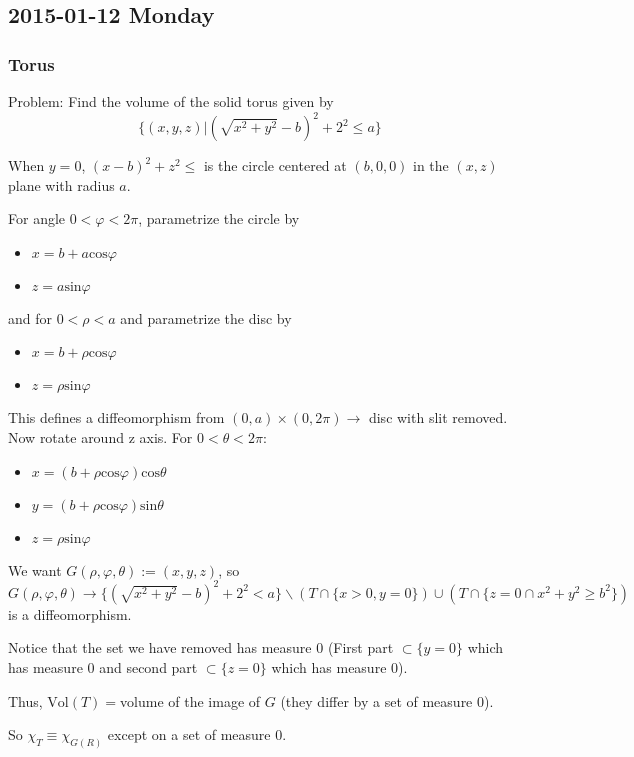 
\subsection{2015-01-12 Monday}
\subsubsection{Torus}

Problem: Find the volume of the solid torus given by 
$$\{(x,y,z)|(\sqrt{x^2+y^2}-b)^2+2^2\leq a\}$$

When $y=0$, $(x-b)^2+z^2\leq$ is the circle centered at $(b,0,0)$ in the $(x,z)$ plane with radius $a$.

For angle $0<\varphi<2\pi$, parametrize the circle by
\begin{itemize}
\item $x=b+a\text{cos}\varphi$
\item $z=a\text{sin}\varphi$
\end{itemize}
and for $0<\rho< a$ and  parametrize the disc by
\begin{itemize}
\item $x=b+\rho\text{cos}\varphi$
\item $z=\rho\text{sin}\varphi$
\end{itemize}

This defines a diffeomorphism from $(0,a)\times(0,2\pi)\rightarrow$ disc with slit removed.  Now rotate around z axis.  For $0<\theta<2\pi$:
\begin{itemize}
\item $x=(b+\rho\text{cos}\varphi)\text{cos}\theta$
\item $y=(b+\rho\text{cos}\varphi)\text{sin}\theta$
\item $z=\rho\text{sin}\varphi$
\end{itemize}

We want $G(\rho,\varphi,\theta):=(x,y,z)$, so 
$G(\rho,\varphi,\theta)\rightarrow\{(\sqrt{x^2+y^2}-b)^2+2^2< a\}  \backslash(T\cap\{x>0,y=0\})\cup(T\cap\{z=0\cap x^2+y^2\geq b^2\})$
is a diffeomorphism.

Notice that the set we have removed has measure 0 (First part $\subset\{y=0\}$ which has measure 0 and second part $\subset\{z=0\}$ which has measure 0).

Thus, $\text{Vol}(T)=$volume of the image of $G$ (they differ by a set of measure 0).

So $\chi_T\equiv\chi_{G(R)}$ except on a set of measure 0.

